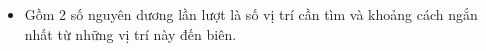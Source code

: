 \begin{itemize}
	\item Gồm 2 số nguyên dương lần lượt là số vị trí cần tìm và khoảng cách ngắn nhất từ những vị trí này đến biên.
\end{itemize}